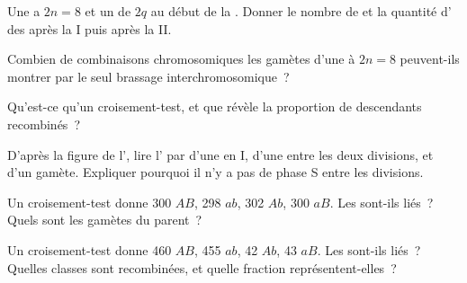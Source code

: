\begin{exercise}[$\star$]\label{exo:g12:meiosis-genetic-shuffling:3}
Une  a $2n = 8$ et un  de $2q$ au début de la . Donner
le nombre de  et la quantité d' des  après la
 I puis après la  II.
\end{exercise}

\begin{exercise}[$\star$]\label{exo:g12:meiosis-genetic-shuffling:4}
Combien de combinaisons chromosomiques les gamètes d'une  à
$2n = 8$ peuvent-ils montrer par le seul brassage interchromosomique~?
\end{exercise}

\begin{exercise}[$\star$]\label{exo:g12:meiosis-genetic-shuffling:5}
Qu'est-ce qu'un croisement-test, et que révèle la proportion de
descendants recombinés~?
\end{exercise}

\begin{exercise}[$\star\star$]\label{exo:g12:meiosis-genetic-shuffling:6}
D'après la figure de l', lire l' par  d'une  en
 I, d'une  entre les deux divisions, et d'un gamète.
Expliquer pourquoi il n'y a pas de phase S entre les divisions.
\end{exercise}

\begin{exercise}[$\star\star$]\label{exo:g12:meiosis-genetic-shuffling:7}
Un croisement-test donne 300 $AB$, 298 $ab$, 302 $Ab$, 300 $aB$. Les
 sont-ils liés~? Quels sont les gamètes du parent~?
\end{exercise}

\begin{exercise}[$\star\star$]\label{exo:g12:meiosis-genetic-shuffling:8}
Un croisement-test donne 460 $AB$, 455 $ab$, 42 $Ab$, 43 $aB$. Les
 sont-ils liés~? Quelles classes sont recombinées, et quelle
fraction représentent-elles~?
\end{exercise}

